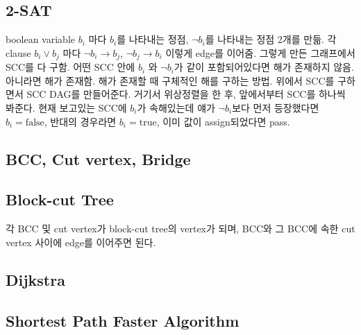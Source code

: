 \documentclass[9pt,landscape,a4paper,twocolumn]{extarticle}
\begin{document}
\subsection{2-SAT}
boolean variable $b_{i}$ 마다 $b_{i}$를 나타내는 정점, $\neg b_{i} $를 나타내는 정점 2개를 만듦. 각 clause $b_{i} \lor b_{j}$ 마다 $\neg b_{i} \to b_{j}$, $\neg b_{j} \to b_{i}$ 이렇게 edge를 이어줌. 그렇게 만든 그래프에서 SCC를 다 구함. 어떤 SCC 안에 $b_{i}$ 와 $\neg b_{i}$가 같이 포함되어있다면 해가 존재하지 않음. 아니라면 해가 존재함. 해가 존재할 때 구체적인 해를 구하는 방법. 위에서 SCC를 구하면서 SCC DAG를 만들어준다. 거기서 위상정렬을 한 후, 앞에서부터 SCC를 하나씩 봐준다. 현재 보고있는 SCC에 $b_{i}$가 속해있는데 얘가 $\neg b_{i}$보다 먼저 등장했다면 $b_{i} = \mathrm{false}$, 반대의 경우라면 $b_{i} = \mathrm{true}$, 이미 값이 assign되었다면 pass.

\subsection{BCC, Cut vertex, Bridge}


\subsection{Block-cut Tree}

각 BCC 및 cut vertex가 block-cut tree의 vertex가 되며, BCC와 그 BCC에 속한 cut vertex 사이에 edge를 이어주면 된다.

\subsection{Dijkstra}


% 

% 

\subsection{Shortest Path Faster Algorithm}

\end{document}
